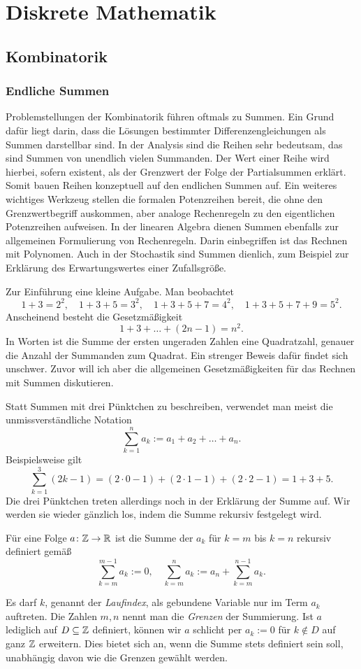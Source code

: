 
\chapter{Diskrete Mathematik}

\section{Kombinatorik}

\subsection{Endliche Summen}

Problemstellungen der Kombinatorik führen oftmals zu Summen.
Ein Grund dafür liegt darin, dass die Lösungen bestimmter
Differenzengleichungen als Summen darstellbar sind. In der Analysis
sind die Reihen sehr bedeutsam, das sind Summen von unendlich vielen
Summanden. Der Wert einer Reihe wird hierbei, sofern existent, als der
Grenzwert der Folge der Partialsummen erklärt.
Somit bauen Reihen konzeptuell auf den endlichen Summen auf.
Ein weiteres wichtiges Werkzeug stellen die formalen Potenzreihen bereit,
die ohne den Grenzwertbegriff auskommen, aber analoge Rechenregeln zu
den eigentlichen Potenzreihen aufweisen. In der linearen Algebra dienen
Summen ebenfalls zur allgemeinen Formulierung von Rechenregeln.
Darin einbegriffen ist das Rechnen mit Polynomen. Auch in der
Stochastik sind Summen dienlich, zum Beispiel zur Erklärung des
Erwartungswertes einer Zufallsgröße.

Zur Einführung eine kleine Aufgabe. Man beobachtet
\[1+3 = 2^2,\quad 1+3+5 = 3^2,\quad 1+3+5+7 = 4^2,\quad 1+3+5+7+9 = 5^2.\]
Anscheinend besteht die Gesetzmäßigkeit
\[1 + 3 + \ldots  + (2n-1) = n^2.\]
In Worten ist die Summe der ersten ungeraden Zahlen eine Quadratzahl,
genauer die Anzahl der Summanden zum Quadrat. Ein strenger Beweis dafür
findet sich unschwer. Zuvor will ich aber die allgemeinen Gesetzmäßigkeiten
für das Rechnen mit Summen diskutieren.

Statt Summen mit drei Pünktchen zu beschreiben, verwendet man meist die
unmissverständliche Notation
\[\textstyle\sum_{k=1}^n a_k := a_1 + a_2 + \ldots + a_n.\]
Beispielsweise gilt
\[\textstyle\sum_{k=1}^3 (2k-1) =
(2\cdot 0-1) + (2\cdot 1 -1 ) + (2\cdot 2 - 1)
= 1 + 3 + 5.\]
Die drei Pünktchen treten allerdings noch in der Erklärung der Summe
auf. Wir werden sie wieder gänzlich los, indem die Summe rekursiv
festgelegt wird.

\begin{Definition}[Summe]\newlinefirst
Für eine Folge $a\colon\mathbb Z\to\mathbb R$ ist die Summe der $a_k$ für $k=m$ bis
$k=n$ rekursiv definiert gemäß
\[\sum_{k=m}^{m-1} a_k := 0,\quad \sum_{k=m}^n a_k := a_n + \sum_{k=m}^{n-1} a_k.\]
\end{Definition}
Es darf $k$, genannt der \emph{Laufindex}, als gebundene Variable nur
im Term $a_k$ auftreten. Die Zahlen $m,n$ nennt man die \emph{Grenzen}
der Summierung. Ist $a$ lediglich auf $D\subseteq\mathbb Z$ definiert, können
wir $a$ schlicht per $a_k := 0$ für $k\notin D$ auf ganz $\mathbb Z$ erweitern.
Dies bietet sich an, wenn die Summe stets definiert sein soll,
unabhängig davon wie die Grenzen gewählt werden.

